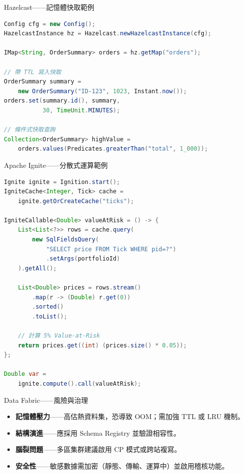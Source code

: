 \documentclass[UTF8]{beamer}
\begin{document}
\begin{frame}[fragile]{Hazelcast——記憶體快取範例}
    \begin{lstlisting}[language=Java]
Config cfg = new Config();
HazelcastInstance hz = Hazelcast.newHazelcastInstance(cfg);

IMap<String, OrderSummary> orders = hz.getMap("orders");

// 帶 TTL 寫入快取
OrderSummary summary =
    new OrderSummary("ID-123", 1023, Instant.now());
orders.set(summary.id(), summary,
           30, TimeUnit.MINUTES);

// 條件式快取查詢
Collection<OrderSummary> highValue =
    orders.values(Predicates.greaterThan("total", 1_000));
  \end{lstlisting}
\end{frame}

\begin{frame}[fragile]{Apache Ignite——分散式運算範例}
    \begin{lstlisting}[language=Java]
Ignite ignite = Ignition.start();
IgniteCache<Integer, Tick> cache =
    ignite.getOrCreateCache("ticks");

IgniteCallable<Double> valueAtRisk = () -> {
    List<List<?>> rows = cache.query(
        new SqlFieldsQuery(
            "SELECT price FROM Tick WHERE pid=?")
            .setArgs(portfolioId)
    ).getAll();

    List<Double> prices = rows.stream()
        .map(r -> (Double) r.get(0))
        .sorted()
        .toList();

    // 計算 5% Value-at-Risk
    return prices.get((int) (prices.size() * 0.05));
};

Double var =
    ignite.compute().call(valueAtRisk);
  \end{lstlisting}
\end{frame}

\begin{frame}{Data Fabric——風險與治理}
    \begin{itemize}
        \item \textbf{記憶體壓力}——高估熱資料集，恐導致 OOM；需加強 TTL 或 LRU 機制。
        \item \textbf{結構演進}——應採用 Schema Registry 並驗證相容性。
        \item \textbf{腦裂問題}——多區集群建議啟用 CP 模式或跨站複寫。
        \item \textbf{安全性}——敏感數據需加密（靜態、傳輸、運算中）並啟用稽核功能。
    \end{itemize}
\end{frame}
\end{document}
